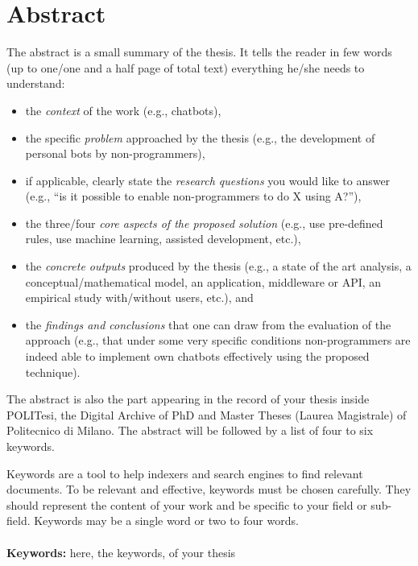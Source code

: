 \chapter*{Abstract} 
The abstract is a small summary of the thesis. It tells the reader in few words (up to one/one and a half page of total text) everything he/she needs to understand: 

\begin{itemize}
\item[\Square] the \emph{context} of the work (e.g., chatbots),
\item[\Square] the specific \emph{problem} approached by the thesis (e.g., the development of personal bots by non-programmers), 
\item[\Square] if applicable, clearly state the \emph{research questions} you would like to answer (e.g., ``is it possible to enable non-programmers to do X using A?''),
\item[\Square] the three/four \emph{core aspects of the proposed solution} (e.g., use pre-defined rules, use machine learning, assisted development, etc.), 
\item[\Square] the \emph{concrete outputs} produced by the thesis (e.g., a state of the art analysis, a conceptual/mathematical model, an application, middleware or API, an empirical study with/without users, etc.), and 
\item[\Square] the \emph{findings and conclusions} that one can draw from the evaluation of the approach (e.g., that under some very specific conditions non-programmers are indeed able to implement own chatbots effectively using the proposed technique).
\end{itemize}



The abstract is also the part appearing in the record of your thesis inside POLITesi,
the Digital Archive of PhD and Master Theses (Laurea Magistrale) of Politecnico di Milano.
The abstract will be followed by a list of four to six keywords.

Keywords are a tool to help indexers and search engines to find relevant documents.
To be relevant and effective, keywords must be chosen carefully.
They should represent the content of your work and be specific to your field or sub-field.
Keywords may be a single word or two to four words. 
\\
\\
\textbf{Keywords:} here, the keywords, of your thesis %

